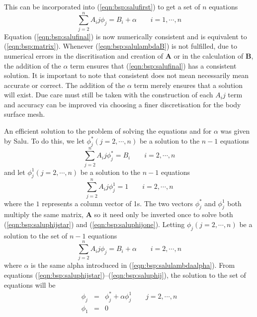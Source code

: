This can be incorporated into (\ref{eqn:bsp:salufirst}) to get a set of $n$
equations
\begin{equation}
\label{eqn:bsp:salufinal}
\sum_{j=2}^n A_ij \phi_j = B_i + \alpha \quad\quad  i = 1,\cdots, n
\end{equation}
Equation (\ref{eqn:bsp:salufinal}) is now numerically consistent and is
equivalent to (\ref{eqn:bsp:matrix}).
Whenever (\ref{eqn:bsp:salulambdaB}) is not fulfilled, due to numerical errors
in the discritisation and creation of $\textbf{A}$ or in the calculation of
$\textbf{B}$, the addition of the $\alpha$ term ensures that
(\ref{eqn:bsp:salufinal}) has a consistent solution.
It is important to note that consistent does not mean necessarily mean accurate
or correct.
The addition of the $\alpha$ term merely ensures that a solution will exist.
Due care must still be taken with the construction of each $A_ij$ term and
accuracy can be improved via choosing a finer discretisation for the body
surface mesh.

An efficient solution to the problem of solving the equations and for $\alpha$
was given by Salu.
To do this, we let $\phi_j^* \left(j=2,\cdots,n\right)$ be a solution to the
$n-1$ equations
\begin{equation}
\label{eqn:bsp:saluphijstar}
\sum_{j=2}^n A_ij \phi_j^* = B_i \quad\quad  i = 2,\cdots, n
\end{equation}
and let $\phi_j^1 \left(j=2,\cdots,n\right)$ be a solution to the $n-1$
equations
\begin{equation}
\label{eqn:bsp:saluphijone}
\sum_{j=2}^n A_ij \phi_j^1 = 1 \quad\quad  i = 2,\cdots, n
\end{equation}
where the $1$ represents a column vector of 1s.
The two vectors $\phi_j^*$ and $\phi_j^1$ both multiply the same matrix,
$\mathbf{A}$ so it need only be inverted once to solve both
(\ref{eqn:bsp:saluphijstar}) and (\ref{eqn:bsp:saluphijone}).
Letting $\phi_j \left(j=2,\cdots,n\right)$ be a solution to the set of $n-1$
equations
\begin{equation}
\label{eqn:bsp:saluphij}
\sum_{j=2}^n A_ij \phi_j = B_i + \alpha \quad\quad  i = 2,\cdots, n
\end{equation}
where $\alpha$ is the same alpha introduced in (\ref{eqn:bsp:salulambdaalpha}).
From equations (\ref{eqn:bsp:saluphijstar})--(\ref{eqn:bsp:saluphij}), the
solution to the set of equations will be
\begin{eqnarray}
\label{eqn:bsp:salusolution}
\phi_j&=&\phi_j^* + \alpha\phi_j^1 \quad\quad  j = 2,\cdots, n \nonumber\\
\phi_1&=&0
\end{eqnarray}

